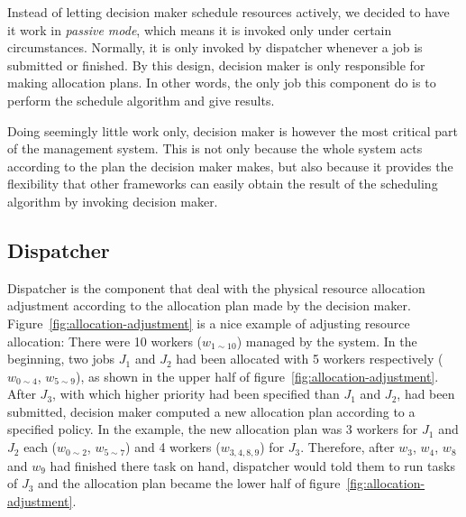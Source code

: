 Instead of letting decision maker schedule resources actively, we
decided to have it work in \emph{passive mode}, which means it is
invoked only under certain circumstances.
Normally, it is only invoked by dispatcher whenever a job is submitted
or finished.
By this design, decision maker is only responsible for making allocation
plans.
In other words, the only job this component do is to perform the
schedule algorithm and give results.


Doing seemingly little work only, decision maker is however the most
critical part of the management system.
This is not only because the whole system acts according to the plan the
decision maker makes, but also because it provides the flexibility that
other frameworks can easily obtain the result of the scheduling
algorithm by invoking decision maker.

\subsection{Dispatcher}

Dispatcher is the component that deal with the physical resource
allocation adjustment according to the allocation plan made by the
decision maker.
Figure~\ref{fig:allocation-adjustment} is a nice example of adjusting
resource allocation: There were 10 workers ($w_{1\sim10}$) managed by
the system.
In the beginning, two jobs $J_1$ and $J_2$ had been allocated with 5
workers respectively ($w_{0\sim4}$, $w_{5\sim9}$), as shown in the upper
half of figure~\ref{fig:allocation-adjustment}.
After $J_3$, with which higher priority had been specified than $J_1$
and $J_2$, had been submitted, decision maker computed a new allocation
plan according to a specified policy.
In the example, the new allocation plan was 3 workers for $J_1$ and
$J_2$ each ($w_{0\sim2}$, $w_{5\sim7}$) and 4 workers ($w_{3,4,8,9}$)
for $J_3$.
Therefore, after $w_3$, $w_4$, $w_8$ and $ w_9$ had finished there task
on hand, dispatcher would told them to run tasks of $J_3$ and the
allocation plan became the lower half of
figure~\ref{fig:allocation-adjustment}.

%  
